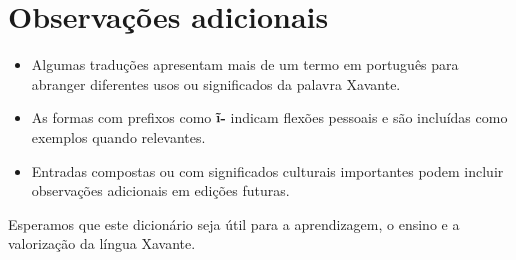 \section*{Observações adicionais}

\begin{itemize}
  \item Algumas traduções apresentam mais de um termo em português para abranger diferentes usos ou significados da palavra Xavante.
  \item As formas com prefixos como \textbf{ĩ-} indicam flexões pessoais e são incluídas como exemplos quando relevantes.
  \item Entradas compostas ou com significados culturais importantes podem incluir observações adicionais em edições futuras.
\end{itemize}

Esperamos que este dicionário seja útil para a aprendizagem, o ensino e a valorização da língua Xavante.